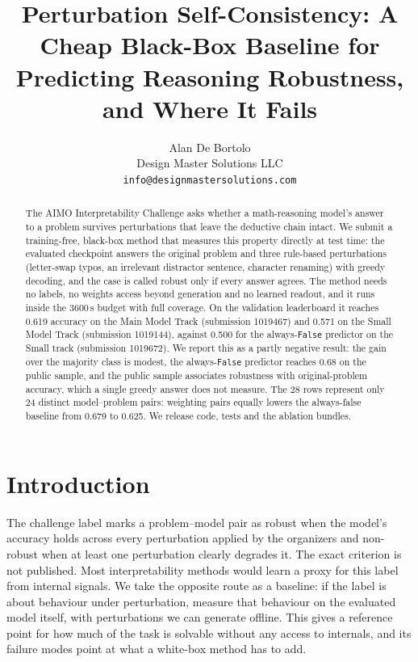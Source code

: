 \documentclass{article}
\title{Perturbation Self-Consistency: A Cheap Black-Box Baseline for Predicting Reasoning Robustness, and Where It Fails}
\author{Alan De Bortolo\\
Design Master Solutions LLC\\
\texttt{info@designmastersolutions.com}}
\begin{document}
\maketitle

\begin{abstract}
The AIMO Interpretability Challenge asks whether a math-reasoning model's answer to a problem survives perturbations that leave the deductive chain intact. We submit a training-free, black-box method that measures this property directly at test time: the evaluated checkpoint answers the original problem and three rule-based perturbations (letter-swap typos, an irrelevant distractor sentence, character renaming) with greedy decoding, and the case is called robust only if every answer agrees. The method needs no labels, no weights access beyond generation and no learned readout, and it runs inside the 3600\,s budget with full coverage. On the validation leaderboard it reaches 0.619 accuracy on the Main Model Track (submission 1019467) and 0.571 on the Small Model Track (submission 1019144), against 0.500 for the always-\texttt{False} predictor on the Small track (submission 1019672). We report this as a partly negative result: the gain over the majority class is modest, the always-\texttt{False} predictor reaches 0.68 on the public sample, and the public sample associates robustness with original-problem accuracy, which a single greedy answer does not measure. The 28 rows represent only 24 distinct model--problem pairs: weighting pairs equally lowers the always-false baseline from 0.679 to 0.625. We release code, tests and the ablation bundles.
\end{abstract}

\section{Introduction}
The challenge label marks a problem--model pair as robust when the model's accuracy holds across every perturbation applied by the organizers and non-robust when at least one perturbation clearly degrades it. The exact criterion is not published. Most interpretability methods would learn a proxy for this label from internal signals. We take the opposite route as a baseline: if the label is about behaviour under perturbation, measure that behaviour on the evaluated model itself, with perturbations we can generate offline. This gives a reference point for how much of the task is solvable without any access to internals, and its failure modes point at what a white-box method has to add.
\end{document}
